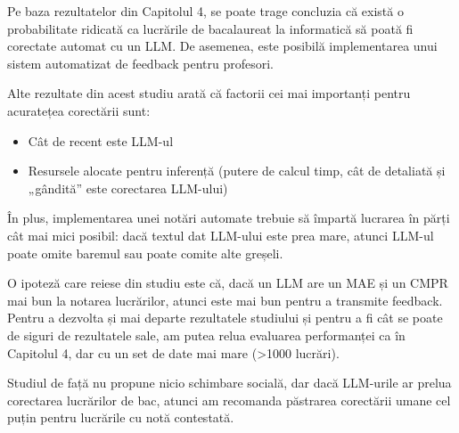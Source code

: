 Pe baza rezultatelor din Capitolul 4, se poate trage concluzia că există o probabilitate ridicată ca lucrările de bacalaureat la informatică să poată fi corectate automat cu un LLM. De asemenea, este posibilă implementarea unui sistem automatizat de feedback pentru profesori.

Alte rezultate din acest studiu arată că factorii cei mai importanți pentru acuratețea corectării sunt:
\begin{itemize}
\item Cât de recent este LLM-ul
\item Resursele alocate pentru inferență (putere de calcul \times timp, cât de detaliată și „gândită” este corectarea LLM-ului)
\end{itemize}

În plus, implementarea unei notări automate trebuie să împartă lucrarea în părți cât mai mici posibil: dacă textul dat LLM-ului este prea mare, atunci LLM-ul poate omite baremul sau poate comite alte greșeli.

O ipoteză care reiese din studiu este că, dacă un LLM are un MAE și un CMPR mai bun la notarea lucrărilor, atunci este mai bun pentru a transmite feedback. Pentru a dezvolta și mai departe rezultatele studiului și pentru a fi cât se poate de siguri de rezultatele sale, am putea relua evaluarea performanței ca în Capitolul 4, dar cu un set de date mai mare (>1000 lucrări).

Studiul de față nu propune nicio schimbare socială, dar dacă LLM-urile ar prelua corectarea lucrărilor de bac, atunci am recomanda păstrarea corectării umane cel puțin pentru lucrările cu notă contestată.